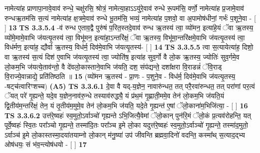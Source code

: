 \documentclass[17pt]{extarticle}
\begin{document}
                  नामेत्या॑ह प्राणापा॒नावे॒वाव॑ रुन्धे॒ चक्षु॑रसि॒ श्रोत्रं॒ नामेत्या॒हाऽऽयु॑रे॒वाव॑ रुन्धे रू॒पम॑सि॒ वर्णो॒ नामेत्या॑ह प्र॒जामे॒वाव॑ रुन्धऋ॒तम॑सि स॒त्यं नामेत्या॑ह क्ष॒त्रमे॒वाव॑ रुन्धे भू॒तम॑सि॒ भव्यं॒ नामेत्या॑ह प॒शवो॒ वा अ॒पामोष॑धीनां॒ गर्भः॑ प॒शूने॒वा - [  ] \textbf{  13} \newline
                  \newline
                                \textbf{ TS 3.3.5.4} \newline
                  -व॑ रुन्ध ए॒ताव॒द्वै पुरु॑षं प॒रित॒स्तदे॒वाव॑ रुन्ध ऋ॒तस्य॑ त्वा॒ व्यो॑मन॒ इत्या॑हे॒यं ॅवा ऋ॒तस्य॒ व्यो॑मे॒मामे॒वाभि ज॑यत्यृ॒तस्य॑ त्वा॒ विभू॑मन॒ इत्या॑हा॒ऽन्तरि॑क्षं॒ ॅवा ऋ॒तस्य॒ विभू॑मा॒न्तरि॑क्षमे॒वाभि ज॑यत्यृ॒तस्य॑ त्वा॒ विध॑र्मण॒ इत्या॑ह॒ द्यौर्वा ऋ॒तस्य॒ विध॑र्म॒ दिव॑मे॒वाभि ज॑यत्यृ॒तस्य॑- [  ] \textbf{  14} \newline
                  \newline
                                \textbf{ TS 3.3.5.5} \newline
                  त्वा स॒त्यायेत्या॑ह॒ दिशो॒ वा ऋ॒तस्य॑ स॒त्यं दिश॑ ए॒वाभि ज॑यत्यृ॒तस्य॑ त्वा॒ ज्योति॑ष॒ इत्या॑ह सुव॒र्गो वै लो॒क ऋ॒तस्य॒ ज्योतिः॑ सुव॒र्गमे॒व लो॒कम॒भि ज॑यत्ये॒ताव॑न्तो॒ वै दे॑वलो॒कास्ताने॒वाभि ज॑यति॒ दश॒ संप॑द्यन्ते॒ दशा᳚क्षरा वि॒राडन्नं॑ ॅवि॒राड् वि॒राज्ये॒वान्नाद्ये॒ प्रति॑तिष्ठति ॥ \textbf{  15} \newline
                  \newline
                      (व्यो॑मन ऋ॒तस्य॑ - प्रा॒णः - प॒शुने॒व - विध॑र्म॒ दिव॑मे॒वाभि ज॑यत्यृ॒तस्य॒ -षट्च॑त्वारिꣳशच्च)  \textbf{(A5)} \newline \newline
                                        \textbf{ TS 3.3.6.1} \newline
                  दे॒वा वै यद्-य॒ज्ञेन॒ नावारु॑न्धत॒ तत् परै॒रवा॑रुन्धत॒ तत् परा॑णां पर॒त्वं ॅयत् परे॑ गृ॒ह्यन्ते॒ यदे॒व य॒ज्ञेन॒नाव॑रु॒न्धे तस्याव॑रुद्ध्यै॒ यं प्र॑थ॒मं गृ॒ह्णाती॒ममे॒व तेन॑ लो॒कम॒भि ज॑यति॒यं द्वि॒तीय॑म॒न्तरि॑क्षं॒ तेन॒ यं तृ॒तीय॑म॒मुमे॒व तेन॑ लो॒कम॒भि ज॑यति॒ यदे॒ते गृ॒ह्यन्त॑ ए॒षां ॅलो॒काना॑म॒भिजि॑त्या॒ - [  ] \textbf{  16} \newline
                  \newline
                                \textbf{ TS 3.3.6.2} \newline
                  उत्त॑रे॒ष्वहः॑ स्व॒मुतो॒ऽर्वाञ्चो॑ गृह्यन्ते ऽभि॒जित्यै॒वेमां ॅलो॒कान् पुन॑रि॒मं ॅलो॒कं प्र॒त्यव॑रोहन्ति॒ यत् पूर्वे॒ष्वहः॑ स्वि॒तः परा᳚ञ्चो गृ॒ह्यन्ते॒ तस्मा॑दि॒तः परा᳚ञ्च इ॒मे लो॒का यदुत्त॑रे॒ष्वहः॑ स्व॒मुतो॒ऽर्वाञ्चो॑ गृ॒ह्यन्ते॒ तस्मा॑द॒मुतो॒ ऽर्वाञ्च॑ इ॒मे लो॒कास्तस्मा॒दया॑तयाम्नो लो॒कान् म॑नु॒ष्या॑ उप॑ जीवन्ति ब्रह्मवा॒दिनो॑ वदन्ति॒ कस्मा᳚थ् स॒त्याद॒द्भ्य ओष॑धयः॒ सं भ॑व॒न्त्योष॑धयो - [  ] \textbf{  17} \newline
\end{document}
